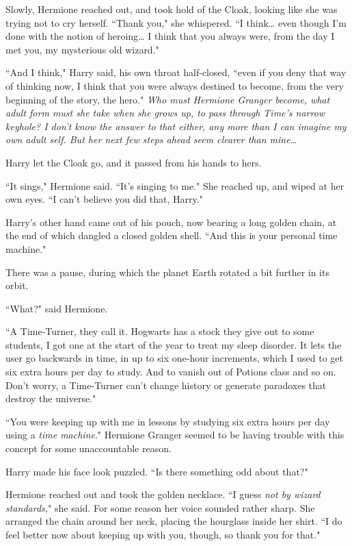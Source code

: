 Slowly, Hermione reached out, and took hold of the Cloak, looking like she was trying not to cry herself. ``Thank you," she whispered. ``I think{\ldots} even though I'm done with the notion of heroing{\ldots} I think that you always were, from the day I met you, my mysterious old wizard."

``And I think," Harry said, his own throat half-closed, ``even if you deny that way of thinking now, I think that you were always destined to become, from the very beginning of the story, the hero." \emph{Who must Hermione Granger become, what adult form must she take when she grows up, to pass through Time's narrow keyhole? I don't know the answer to that either, any more than I can imagine my own adult self. But her next few steps ahead seem clearer than mine{\ldots}}

Harry let the Cloak go, and it passed from his hands to hers.

``It sings," Hermione said. ``It's singing to me." She reached up, and wiped at her own eyes. ``I can't believe you did that, Harry."

Harry's other hand came out of his pouch, now bearing a long golden chain, at the end of which dangled a closed golden shell. ``And this is your personal time machine."

There was a pause, during which the planet Earth rotated a bit further in its orbit.

``What?" said Hermione.

``A Time-Turner, they call it. Hogwarts has a stock they give out to some students, I got one at the start of the year to treat my sleep disorder. It lets the user go backwards in time, in up to six one-hour increments, which I used to get six extra hours per day to study. And to vanish out of Potions class and so on. Don't worry, a Time-Turner can't change history or generate paradoxes that destroy the universe."

``You were keeping up with me in lessons by studying six extra hours per day using a \emph{time machine}." Hermione Granger seemed to be having trouble with this concept for some unaccountable reason.

Harry made his face look puzzled. ``Is there something odd about that?"

Hermione reached out and took the golden necklace. ``I guess \emph{not by wizard standards,}" she said. For some reason her voice sounded rather sharp. She arranged the chain around her neck, placing the hourglass inside her shirt. ``I do feel better now about keeping up with you, though, so thank you for that."

